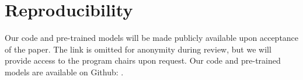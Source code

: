 \section*{Reproducibility}

\ifanonymized
Our code and pre-trained models will be made publicly available
upon acceptance of the paper.
The link is omitted for anonymity during review,
but we will provide access to the program chairs
upon request.
\else
Our code and pre-trained models are available on Github: .
\fi

